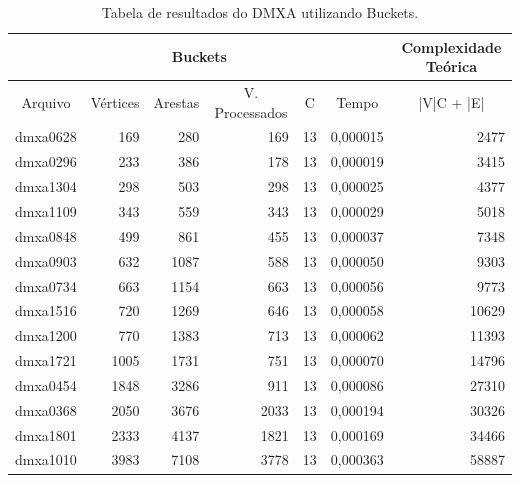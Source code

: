\documentclass[
	12pt,				%
	oneside,			%
	a4paper,			%
	english,			%
	french,				%
	spanish,			%
	brazil,				%
	]{abntex2}
\begin{document}
\begin{table}[H]
  \centering    
  \begin{tabular}{|c|r|r|r|r|r|r|}
    \toprule
    \multicolumn{6}{|c|}{\cellcolor{gray!25}\textbf{Buckets}} & \multicolumn{1}{|c|}{\cellcolor{gray!25}\textbf{Complexidade Teórica}}\\
    \midrule
    \multicolumn{1}{|c|}{\cellcolor{gray!10}Arquivo} & \multicolumn{1}{|c|}{\cellcolor{gray!10}Vértices} & \multicolumn{1}{|c|}{\cellcolor{gray!10}Arestas} & \multicolumn{1}{|c|}{\cellcolor{gray!10}V. Processados} & \multicolumn{1}{|c|}{\cellcolor{gray!10}C} &
    \multicolumn{1}{|c|}{\cellcolor{gray!10}Tempo} & \multicolumn{1}{|c|}{\cellcolor{gray!10}|V|C + |E|}\\
    \hline
    dmxa0628	&	169	&	280	&	169	&	13	&	0,000015	&	2477	\\
    \hline
    dmxa0296	&	233	&	386	&	178	&	13	&	0,000019	&	3415	\\
    \hline
    dmxa1304	&	298	&	503	&	298	&	13	&	0,000025	&	4377	\\
    \hline
    dmxa1109	&	343	&	559	&	343	&	13	&	0,000029	&	5018	\\
    \hline
    dmxa0848	&	499	&	861	&	455	&	13	&	0,000037	&	7348	\\
    \hline
    dmxa0903	&	632	&	1087	&	588	&	13	&	0,000050	&	9303	\\
    \hline
    dmxa0734	&	663	&	1154	&	663	&	13	&	0,000056	&	9773	\\
    \hline
    dmxa1516	&	720	&	1269	&	646	&	13	&	0,000058	&	10629	\\
    \hline
    dmxa1200	&	770	&	1383	&	713	&	13	&	0,000062	&	11393	\\
    \hline
    dmxa1721	&	1005	&	1731	&	751	&	13	&	0,000070	&	14796	\\
    \hline
    dmxa0454	&	1848	&	3286	&	911	&	13	&	0,000086	&	27310	\\
    \hline
    dmxa0368	&	2050	&	3676	&	2033	&	13	&	0,000194 &	30326	\\
    \hline
    dmxa1801	&	2333	&	4137	&	1821	&	13	&	0,000169 &	34466	\\
    \hline
    dmxa1010	&	3983	&	7108	&	3778	&	13	&	0,000363 &	58887	\\   
    \hline
  \end{tabular}
  \caption{Tabela de resultados do DMXA utilizando Buckets.}  
  \label{tab:DmxaBuckets}
\end{table}
\end{document}
